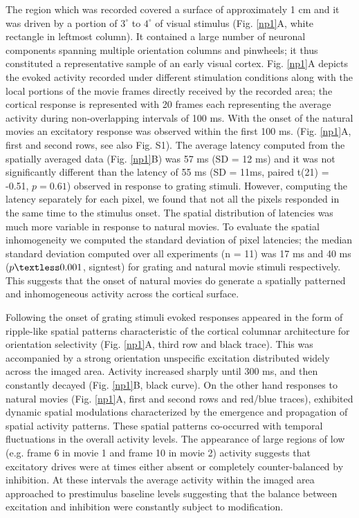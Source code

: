 The region which was recorded covered a surface of approximately 1 cm and
it was driven by a portion of $3^\circ$ to $4^\circ$  of visual stimulus
(Fig. \ref{np1}A, white rectangle in leftmost column). It contained a large
number of neuronal components spanning multiple orientation columns and
pinwheels; it thus constituted a representative sample of an early visual
cortex. Fig. \ref{np1}A depicts the evoked activity recorded under
different stimulation conditions along with the local portions of the movie
frames directly received by the recorded area; the cortical response is
represented with 20 frames each representing the average activity during
non-overlapping intervals of 100 ms. With the onset of the natural movies
an excitatory response was observed within the first 100 ms. (Fig.
\ref{np1}A, first and second rows, see also Fig. S1). The average latency
computed from the spatially averaged data (Fig. \ref{np1}B) was 57 ms (SD =
12 ms) and it was not significantly different than the latency of 55 ms (SD
= 11ms, paired t(21) = -0.51, $p = 0.61$) observed in response to grating
stimuli. However, computing the latency separately for each pixel, we found
that not all the pixels responded in the same time to the stimulus onset.
The spatial distribution of latencies was much more variable in response to
natural movies. To evaluate the spatial inhomogeneity we computed the
standard deviation of pixel latencies; the median standard deviation
computed over all experiments (n = 11) was 17 ms and 40 ms ($p \textless
0.001$, signtest) for grating and natural movie stimuli respectively. This
suggests that the onset of natural movies do generate a spatially patterned
and inhomogeneous activity across the cortical surface. 

Following the onset of grating stimuli evoked responses appeared in the
form of ripple-like spatial patterns characteristic of the cortical
columnar architecture for orientation selectivity (Fig.  \ref{np1}A, third row and
black trace). This was accompanied by a strong orientation unspecific
excitation distributed widely across the imaged area. Activity increased
sharply until 300 ms, and then constantly decayed (Fig. \ref{np1}B, black curve).
On the other hand responses to natural movies (Fig. \ref{np1}A, first and second
rows and red/blue traces), exhibited dynamic spatial modulations
characterized by the emergence and propagation of spatial activity
patterns. These spatial patterns co-occurred with temporal fluctuations in
the overall activity levels. The appearance of large regions of low (e.g.
frame 6 in movie 1 and frame 10 in movie 2) activity suggests that
excitatory drives were at times either absent or completely
counter-balanced by inhibition. At these intervals the average activity
within the imaged area approached to prestimulus baseline levels suggesting
that the balance between excitation and inhibition were constantly subject
to modification. 

